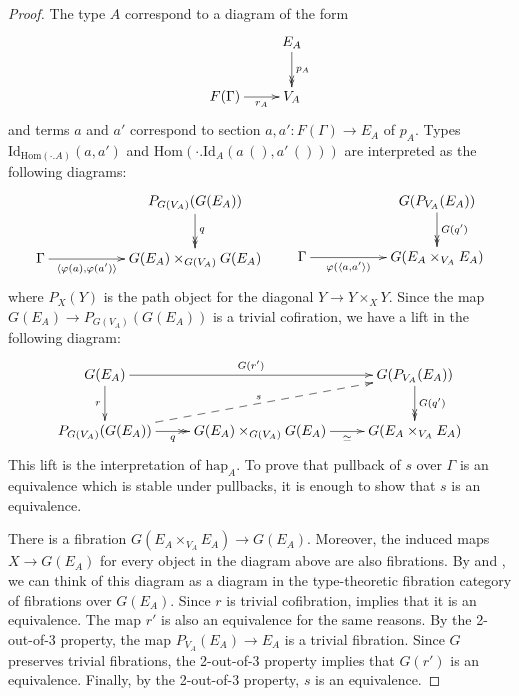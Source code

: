 \documentclass[reqno]{amsart}
\theoremstyle{definition}
\theoremstyle{remark}
\newcommand{\fs}[1]{\mathrm{#1}}
\newcommand{\Hom}{\fs{Hom}}
\newcommand{\Id}{\fs{Id}}
\numberwithin{figure}{section}
\begin{document}
\begin{proof}
The type $A$ correspond to a diagram of the form
\[ \xymatrix{                           & E_A \ar@{->>}[d]^{p_A} \\
              F(\Gamma) \ar[r]_-{r_A}   & V_A
            } \]
and terms $a$ and $a'$ correspond to section $a,a' : F(\Gamma) \to E_A$ of $p_A$.
Types $\Id_{\Hom(\cdot . A)}(a,a')$ and $\Hom(\cdot . \Id_A(a\,(),a'\,()))$ are interpreted as the following diagrams:
\[ \xymatrix{                                                           & & P_{G(V_A)}(G(E_A)) \ar@{->>}[d]^q \\
              \Gamma \ar[rr]_-{\langle \varphi(a), \varphi(a') \rangle} & & G(E_A) \times_{G(V_A)} G(E_A)
            } \qquad
   \xymatrix{                                                   & & G(P_{V_A}(E_A)) \ar@{->>}[d]^{G(q')} \\
              \Gamma \ar[rr]_-{\varphi(\langle a, a' \rangle)}  & & G(E_A \times_{V_A} E_A)
            } \]
where $P_{X}(Y)$ is the path object for the diagonal $Y \to Y \times_{X} Y$.
Since the map $G(E_A) \to P_{G(V_A)}(G(E_A))$ is a trivial cofiration, we have a lift in the following diagram:
\[ \xymatrix{ G(E_A) \ar[d]_r \ar[rr]^-{G(r')}                      &                                               & G(P_{V_A}(E_A)) \ar@{->>}[d]^{G(q')} \\
              P_{G(V_A)}(G(E_A)) \ar@{->>}[r]_-q \ar@{-->}[urr]^s   & G(E_A) \times_{G(V_A)} G(E_A) \ar[r]_-\simeq  & G(E_A \times_{V_A} E_A)
            } \]
This lift is the interpretation of $\fs{hap}_A$.
To prove that pullback of $s$ over $\Gamma$ is an equivalence which is stable under pullbacks, it is enough to show that $s$ is an equivalence.

There is a fibration $G(E_A \times_{V_A} E_A) \to G(E_A)$.
Moreover, the induced maps $X \to G(E_A)$ for every object in the diagram above are also fibrations.
By  and , we can think of this diagram as a diagram in the type-theoretic fibration category of fibrations over $G(E_A)$.
Since $r$ is trivial cofibration, \cite[Lemma~3.6]{shul-inv} implies that it is an equivalence.
The map $r'$ is also an equivalence for the same reasons.
By the 2-out-of-3 property, the map $P_{V_A}(E_A) \to E_A$ is a trivial fibration.
Since $G$ preserves trivial fibrations, the 2-out-of-3 property implies that $G(r')$ is an equivalence.
Finally, by the 2-out-of-3 property, $s$ is an equivalence.
\end{proof}



\end{document}
